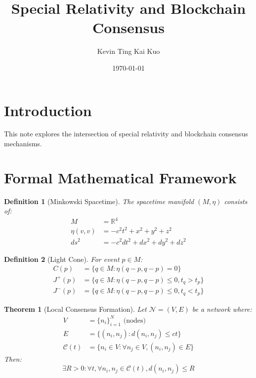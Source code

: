 \documentclass{article}
\newtheorem{theorem}{Theorem}
\newtheorem{definition}{Definition}
\begin{document}
\title{Special Relativity and Blockchain Consensus}
\author{Kevin Ting Kai Kuo}
\date{\today}
\maketitle

\section{Introduction}
This note explores the intersection of special relativity and blockchain consensus mechanisms.

\section{Formal Mathematical Framework}

\begin{definition}[Minkowski Spacetime]
The spacetime manifold $(M, \eta)$ consists of:
\begin{align*}
    M &= \mathbb{R}^4 \\
    \eta(v, v) &= -c^2t^2 + x^2 + y^2 + z^2 \\
    ds^2 &= -c^2dt^2 + dx^2 + dy^2 + dz^2
\end{align*}
\end{definition}

\begin{definition}[Light Cone]
For event $p \in M$:
\begin{align*}
    C(p) &= \{q \in M : \eta(q-p, q-p) = 0\} \\
    J^+(p) &= \{q \in M : \eta(q-p, q-p) \leq 0, t_q > t_p\} \\
    J^-(p) &= \{q \in M : \eta(q-p, q-p) \leq 0, t_q < t_p\}
\end{align*}
\end{definition}

\begin{theorem}[Local Consensus Formation]
Let $\mathcal{N} = (V, E)$ be a network where:
\begin{align*}
    V &= \{n_i\}_{i=1}^N \text{ (nodes)} \\
    E &= \{(n_i, n_j) : d(n_i, n_j) \leq ct\} \\
    \mathcal{C}(t) &= \{n_i \in V : \forall n_j \in V, (n_i, n_j) \in E\}
\end{align*}
Then:
\[ \exists R > 0 : \forall t, \forall n_i, n_j \in \mathcal{C}(t), d(n_i, n_j) \leq R \]
\end{theorem}
\end{document}
